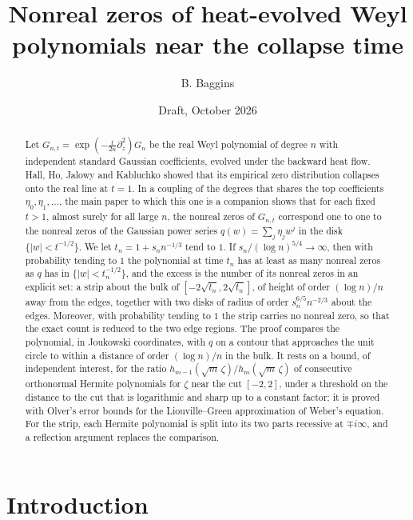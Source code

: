 \documentclass[11pt]{amsart}
\title{Nonreal zeros of heat-evolved Weyl polynomials near the collapse time}
\author{B. Baggins}
\date{Draft, October 2026}
\theoremstyle{definition}
\theoremstyle{remark}
\numberwithin{equation}{section}
\begin{document}
\begin{abstract}
Let $G_{n,t}=\exp(-\frac{t}{2n}\partial_z^2)G_n$ be the real Weyl polynomial of degree $n$ with independent standard Gaussian coefficients, evolved under the backward heat flow. Hall, Ho, Jalowy and Kabluchko showed that its empirical zero distribution collapses onto the real line at $t=1$. In a coupling of the degrees that shares the top coefficients $\eta_0,\eta_1,\dots$, the main paper to which this one is a companion shows that for each fixed $t>1$, almost surely for all large $n$, the nonreal zeros of $G_{n,t}$ correspond one to one to the nonreal zeros of the Gaussian power series $q(w)=\sum_j\eta_jw^j$ in the disk $\{|w|<t^{-1/2}\}$. We let $t_n=1+s_nn^{-1/3}$ tend to $1$. If $s_n/(\log n)^{5/4}\to\infty$, then with probability tending to $1$ the polynomial at time $t_n$ has at least as many nonreal zeros as $q$ has in $\{|w|<t_n^{-1/2}\}$, and the excess is the number of its nonreal zeros in an explicit set: a strip about the bulk of $[-2\sqrt{t_n},2\sqrt{t_n}]$, of height of order $(\log n)/n$ away from the edges, together with two disks of radius of order $s_n^{6/5}n^{-2/3}$ about the edges. Moreover, with probability tending to $1$ the strip carries no nonreal zero, so that the exact count is reduced to the two edge regions. The proof compares the polynomial, in Joukowski coordinates, with $q$ on a contour that approaches the unit circle to within a distance of order $(\log n)/n$ in the bulk. It rests on a bound, of independent interest, for the ratio $h_{m-1}(\sqrt m\,\zeta)/h_m(\sqrt m\,\zeta)$ of consecutive orthonormal Hermite polynomials for $\zeta$ near the cut $[-2,2]$, under a threshold on the distance to the cut that is logarithmic and sharp up to a constant factor; it is proved with Olver's error bounds for the Liouville--Green approximation of Weber's equation. For the strip, each Hermite polynomial is split into its two parts recessive at $\mp i\infty$, and a reflection argument replaces the comparison.
\end{abstract}

\maketitle

\section{Introduction}\label{sec:intro}
\end{document}

